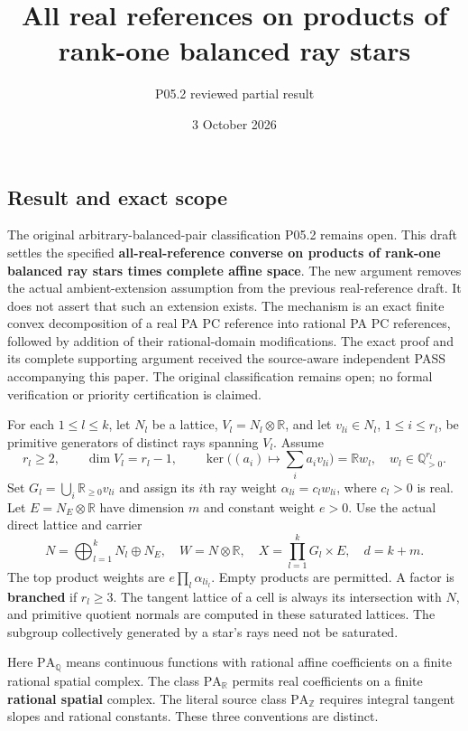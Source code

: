 \documentclass[
  11pt,
]{article}
\title{All real references on products of rank-one balanced ray stars}
\author{P05.2 reviewed partial result}
\date{3 October 2026}
\begin{document}
\maketitle

\subsection{Result and exact scope}\label{result-and-exact-scope}

The original arbitrary-balanced-pair classification P05.2 remains open.
This draft settles the specified \textbf{all-real-reference converse on
products of rank-one balanced ray stars times complete affine space}.
The new argument removes the actual ambient-extension assumption from
the previous real-reference draft. It does not assert that such an
extension exists. The mechanism is an exact finite convex decomposition
of a real PA PC reference into rational PA PC references, followed by
addition of their rational-domain modifications. The exact proof and
its complete supporting argument received the source-aware independent
PASS accompanying this paper. The original classification remains open;
no formal verification or priority certification is claimed.

For each \(1\leq l\leq k\), let \(N_l\) be a lattice,
\(V_l=N_l\otimes\mathbb R\), and let \(v_{li}\in N_l\),
\(1\leq i\leq r_l\), be primitive generators of distinct rays spanning
\(V_l\). Assume \[
r_l\geq2,\qquad \dim V_l=r_l-1,\qquad
\ker\bigl((a_i)\mapsto\textstyle\sum_i a_iv_{li}\bigr)
=\mathbb Rw_l,\quad w_l\in\mathbb Q_{>0}^{r_l}.
\tag{S}
\] Set \(G_l=\bigcup_i\mathbb R_{\geq0}v_{li}\) and assign its \(i\)th
ray weight \(\alpha_{li}=c_lw_{li}\), where \(c_l>0\) is real. Let
\(E=N_E\otimes\mathbb R\) have dimension \(m\) and constant weight
\(e>0\). Use the actual direct lattice and carrier \[
N=\bigoplus_{l=1}^kN_l\oplus N_E,\quad W=N\otimes\mathbb R,
\quad X=\prod_{l=1}^kG_l\times E,\quad d=k+m.
\] The top product weights are \(e\prod_l\alpha_{li_l}\). Empty products
are permitted. A factor is \textbf{branched} if \(r_l\geq3\). The
tangent lattice of a cell is always its intersection with \(N\), and
primitive quotient normals are computed in these saturated lattices. The
subgroup collectively generated by a star's rays need not be saturated.

Here \(\mathrm{PA}_{\mathbb Q}\) means continuous functions with
rational affine coefficients on a finite rational spatial complex. The
class \(\mathrm{PA}_{\mathbb R}\) permits real coefficients on a finite
\textbf{rational spatial} complex. The literal source class
\(\mathrm{PA}_{\mathbb Z}\) requires integral tangent slopes and
rational constants. These three conventions are distinct.
\end{document}
